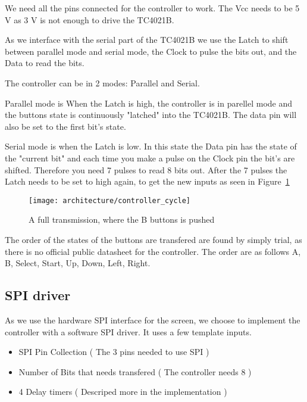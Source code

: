 We need all the pins connected for the controller to work. The Vcc needs to be 5 V as 3 V is not enough to drive the TC4021B.

As we interface with the serial part of the TC4021B we use the Latch to shift between parallel mode and serial mode, the Clock to pulse the bits out, and the Data to read the bits.

The controller can be in 2 modes: Parallel and Serial.

Parallel mode is When the Latch is high, the controller is in parellel mode and the buttons state is continuously "latched" into the TC4021B. The data pin will also be set to the first bit's state.

Serial mode is when the Latch is low. In this state the Data pin has the state of the "current bit" and each time you make a pulse on the Clock pin the bit's are shifted. Therefore you need 7 pulses to read 8 bits out. After the 7 pulses the Latch needs to be set to high again, to get the new inputs as seen in Figure~\ref{fig:controller_cycle}

\begin{figure}
\centering
\texttt{[image: architecture/controller\_cycle]}
\caption{A full transmission, where the B buttons is pushed}
\label{fig:controller_cycle}
\end{figure}

The order of the states of the buttons are transfered are found by simply trial, as there is no official public datasheet for the controller. The order are as follows A, B, Select, Start, Up, Down, Left, Right.

\subsection{SPI driver}

As we use the hardware SPI interface for the screen, we choose to implement the controller with a software SPI driver. It uses a few template inputs.

\begin{itemize}
\item SPI Pin Collection ( The 3 pins needed to use SPI )
\item Number of Bits that needs transfered ( The controller needs 8 )
\item 4 Delay timers ( Descriped more in the implementation )
\end{itemize}
